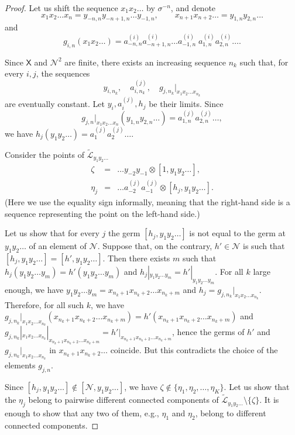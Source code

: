 \documentclass[11pt]{amsart}
\newcommand{\leaf}{\mathcal{L}}
\newcommand{\leaftilde}{\widetilde{\leaf}}
\newcommand{\alb}{\ensuremath{\mathsf{X}}}%
\newcommand{\nuke}{\ensuremath{\mathcal{N}}}%
\theoremstyle{definition}
\theoremstyle{plain}
\newtheorem{main thm}{Theorem}
\theoremstyle{remark}
\theoremstyle{plain}
\begin{document}
\begin{proof}
Let us shift the sequence $x_1x_2\ldots$ by $\sigma^{-n}$, and denote
\[x_1x_2\ldots x_n=y_{-n, n}y_{-n+1, n}\ldots y_{-1, n},\qquad x_{n+1}x_{n+2}\ldots=y_{1, n}y_{2, n}\ldots\]
and 
\[
g_{i, n}(x_1x_2\ldots) = a_{-n, n}^{(i)}a_{-n+1, n}^{(i)}\ldots a_{-1, n}^{(i)}\;a_{1, n}^{(i)}a_{2, n}^{(i)}\ldots.
\]

Since $\alb$ and $\nuke^2$ are finite, there exists an increasing sequence $n_k$ such that, for every $i, j$, the sequences
\[y_{i, n_k},\quad a_{i, n_k}^{(j)},\quad g_{j, n_k}|_{x_1x_2\ldots x_{n_k}}\]
are eventually constant. Let $y_i, a_i^{(j)}, h_j$ be their limits. Since \[g_{j, n}|_{x_1x_2\ldots x_n}(y_{1, n}y_{2, n}\ldots)=a_{1, n}^{(j)}a_{2, n}^{(j)}\ldots,\] we have $h_j(y_1y_2\ldots)=a_1^{(j)}a_2^{(j)}\ldots$. 

Consider the points  of $\leaftilde_{y_1y_2\ldots}$
\begin{eqnarray*}
\zeta &=& \ldots y_{-2}y_{-1}\otimes [1, y_1y_2\ldots],\\
\eta_j &=& \ldots a_{-2}^{(j)}a_{-1}^{(j)}\otimes [h_j, y_1y_2\ldots].
\end{eqnarray*}
(Here we use the equality sign informally, meaning that the right-hand side is a sequence representing the point on the left-hand side.)

Let us show that for every $j$ the germ $[h_j, y_1y_2\ldots]$ is not equal to the germ at $y_1y_2\ldots$ of an element of $\nuke$. Suppose that, on the contrary, $h'\in\nuke$ is such that $[h_j, y_1y_2\ldots]=[h', y_1y_2\ldots]$. Then there exists $m$ such that $h_j(y_1y_2\ldots y_m)=h'(y_1y_2\ldots y_m)$ and $h_j|_{y_1y_2\ldots y_m}=h'|_{y_1y_2\ldots y_m}$. For all $k$ large enough, we have $y_1y_2\ldots y_m=x_{n_k+1}x_{n_k+2}\ldots x_{n_k+m}$ and $h_j=g_{j, n_k}|_{x_1x_2\ldots x_{n_k}}$. Therefore, for all such $k$, we have $g_{j, n_k}|_{x_1x_2\ldots x_{n_k}}(x_{n_k+1}x_{n_k+2}\ldots x_{n_k+m})=h'(x_{n_k+1}x_{n_k+2}\ldots x_{n_k+m})$ and $g_{j, n_k}|_{x_1x_2\ldots x_{n_k}}|_{x_{n_k+1}x_{n_k+2}\ldots x_{n_k+m}}=h'|_{x_{n_k+1}x_{n_k+2}\ldots x_{n_k+m}}$, hence the germs of $h'$ and $g_{j, n_k}|_{x_1x_2\ldots x_{n_k}}$ in $x_{n_k+1}x_{n_k+2}\ldots$ coincide. But this contradicts the choice of the elements $g_{j, n}$.


Since $[h_j, y_1y_2\ldots]\notin[\nuke, y_1y_2\ldots]$, we have $\zeta\notin\{\eta_1, \eta_2, \ldots, \eta_K\}$.  Let us show that the $\eta_j$ belong to pairwise different connected components of $\leaftilde_{y_1y_2\ldots}\setminus\{\zeta\}$.  It is enough to show that any two of them, e.g., $\eta_1$ and $\eta_2$, belong to different connected components. 


\end{proof}
\end{document}

